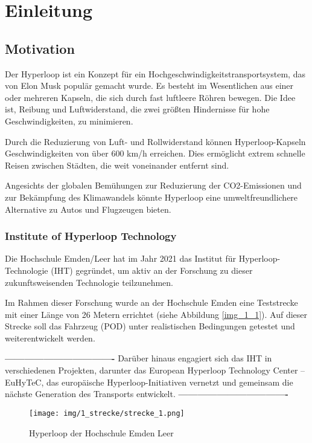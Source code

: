 \chapter{Einleitung}

\section{Motivation}
Der Hyperloop ist ein Konzept für ein Hochgeschwindigkeitstransportsystem, das von Elon Musk \cite{tesla:Hyperloop_impact} populär gemacht wurde. Es besteht im Wesentlichen aus einer oder mehreren Kapseln, die sich durch fast luftleere Röhren bewegen. Die Idee ist, Reibung und Luftwiderstand, die zwei größten Hindernisse für hohe Geschwindigkeiten, zu minimieren.

Durch die Reduzierung von Luft- und Rollwiderstand können Hyperloop-Kapseln Geschwindigkeiten von über 600 km/h erreichen. Dies ermöglicht extrem schnelle Reisen zwischen Städten, die weit voneinander entfernt sind.

Angesichts der globalen Bemühungen zur Reduzierung der CO2-Emissionen und zur Bekämpfung des Klimawandels könnte Hyperloop eine umweltfreundlichere Alternative zu Autos und Flugzeugen bieten.



\subsection{Institute of Hyperloop Technology}
Die Hochschule Emden/Leer hat im Jahr 2021 das Institut für Hyperloop-Technologie (IHT) gegründet, um aktiv an der Forschung zu dieser zukunftsweisenden Technologie teilzunehmen.

Im Rahmen dieser Forschung wurde an der Hochschule Emden eine Teststrecke mit einer Länge von 26 Metern errichtet (siehe Abbildung \ref{img_1_1}). Auf dieser Strecke soll das Fahrzeug (POD) unter realistischen Bedingungen getestet und weiterentwickelt werden.

\textbf{----------------------------------}\newline
Darüber hinaus engagiert sich das IHT in verschiedenen Projekten, darunter das \frqq European Hyperloop Technology Center – EuHyTeC\flqq, das europäische Hyperloop-Initiativen vernetzt und gemeinsam die nächste Generation des Transports entwickelt.\newline
\textbf{----------------------------------}

\begin{figure}[ht]
	\begin{center}
		\texttt{[image: img/1\_strecke/strecke\_1.png]}
		\caption{Hyperloop der Hochschule Emden Leer}
		\label{img_1_1:strecke}
	\end{center}
\end{figure}
\newpage

